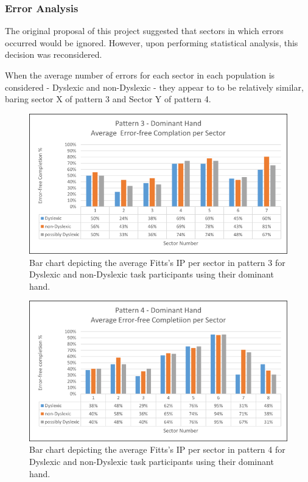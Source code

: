 	\subsubsection{Error Analysis}
		The original proposal of this project suggested that sectors in which errors occurred would be ignored. However, upon performing statistical analysis, this decision was reconsidered.
		
		When the average number of errors for each sector in each population is considered - Dyslexic and non-Dyslexic - they appear to to be relatively similar, baring sector X of pattern 3 and Sector Y of pattern 4.
		
		
		\begin{figure}[]
			\centering
			\includegraphics[width = \textwidth]{../images/pat_3_com_dom}
			\caption{Bar chart depicting the average Fitts's IP per sector in pattern 3 for Dyslexic and non-Dyslexic task participants using their dominant hand.}
			\label{fi_pat_3_com_dom}
		\end{figure}		
		
		\begin{figure}[]
			\centering
			\includegraphics[width = \textwidth]{../images/pat_4_com_dom}
			\caption{Bar chart depicting the average Fitts's IP per sector in pattern 4 for Dyslexic and non-Dyslexic task participants using their dominant hand.}
			\label{fi_pat_4_com_dom}
		\end{figure}
		
